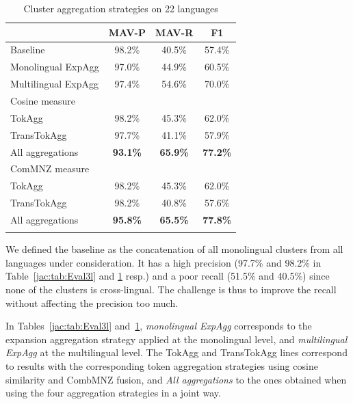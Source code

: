 \documentclass[output=paper]{langsci/langscibook}
\begin{document}
\begin{table}[h]
\centering
\begin{tabular}{lccc}\lsptoprule
&  \textnormal{MAV-P}  & \textnormal{MAV-R}  &  \textnormal{F1} \\ 
\midrule
Baseline                &     98.2\%   &  40.5\%  & 57.4\%  \\ 
Monolingual ExpAgg   &  97.0\%   &  44.9\%  & 60.5\%  \\ 
Multilingual ExpAgg &     97.4\%   &  54.6\%  & 70.0\%  \\ 
\midrule
\textnormal{Cosine measure}                 &    &   &   \\ 
TokAgg          &     98.2\%   &  45.3\%  & 62.0\%  \\  
TransTokAgg  &     97.7\%   &  41.1\%  & 57.9\%  \\
All aggregations &     \textbf{93.1\%}   &  \textbf{65.9\%}  & 
\textbf{77.2\%}  \\
\midrule
\textnormal{ComMNZ measure}                         &    &   &   \\ 
TokAgg          &     98.2\%   &  45.3\%  & 62.0\%  \\ 
TransTokAgg  &     98.2\%   &  40.8\%  & 57.6\%  \\  
All aggregations &     \textbf{95.8\%}   &  \textbf{65.5\%}  & 
\textbf{77.8\%}  \\
\lspbottomrule
\end{tabular}
\caption{Cluster aggregation strategies on 22 languages}
\label{jac:tab:Eval22l}
\end{table}

We defined the baseline as the concatenation of all monolingual
clusters from all languages under consideration. It has a high
precision (97.7\% and 98.2\% in Table~\ref{jac:tab:Eval3l} and
\ref{jac:tab:Eval22l} resp.) and a poor recall (51.5\% and 40.5\%) since
none of the clusters is cross-lingual. The challenge is thus to
improve the recall without affecting the precision too much.

In Tables~\ref{jac:tab:Eval3l} and~\ref{jac:tab:Eval22l}, \textit{monolingual
  ExpAgg} corresponds to the expansion aggregation strategy applied at
the monolingual level, and \textit{multilingual ExpAgg} at the
multilingual level.  The TokAgg and TransTokAgg lines correspond
to results with the corresponding token aggregation strategies using
cosine similarity and CombMNZ fusion, and \textit{All aggregations} to
the ones obtained when using the four aggregation strategies in a
joint way.
\end{document}
